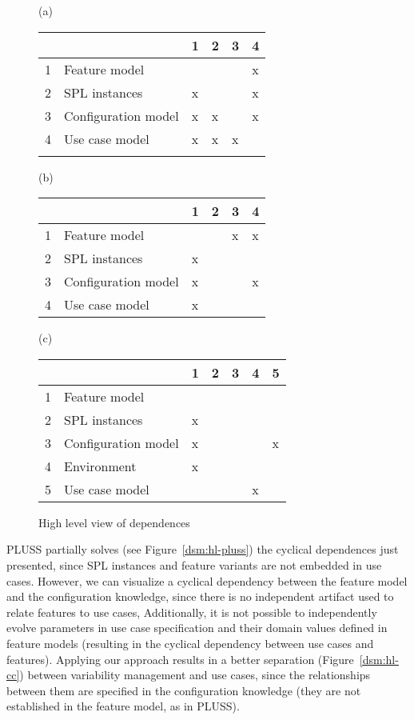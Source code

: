 \documentclass{acm_proc_article-sp}
\begin{document}
\begin{figure}[hb]
\centering
\begin{small}
(a)\newline
\begin{tabular}{llllll} \hline
& & 1 & 2 & 3 & 4 \\ \hline
1 & Feature model 		& 	& 	& 	& x \\ 
2 & SPL instances 		& x 	& 	& 	& x \\
3 & Configuration model 	& x 	& x 	& 	& x \\
4 & Use case model 	& x 	& x 	& x 	& \\ \hline \\
\end{tabular}
(b)\newline
\begin{tabular}{llllll} \hline
& & 1 & 2 & 3 & 4 \\ \hline
1 & Feature model 		& 	& 	& x   & x \\ 
2 & SPL instances 		& x 	& 	& 	&   \\
3 & Configuration model 	& x 	&  	& 	& x \\
4 & Use case model 	& x 	&  	&  	& \\ \hline 
\end{tabular}
(c)\newline
\begin{tabular}{lllllll} \hline
& & 1 & 2 & 3 & 4 & 5 \\ \hline
1 & Feature model 		& 	& 	&      &  	&  	\\ 
2 & SPL instances 		& x 	& 	& 	&   	& 	\\
3 & Configuration model 	& x 	&  	& 	&  	& x	\\
4 & Environment		& x	&	&	&	&  	\\
5 & Use case model 	&  	&  	&  	&  x	& 	\\ \hline
\end{tabular}
\end{small}
\caption{High level view of dependences}
\label{dsm:hl}
\end{figure}

PLUSS partially solves (see Figure~\ref{dsm:hl-pluss}) the cyclical dependences just presented, since SPL instances and feature variants are 
not embedded in use cases. However,  we can visualize a cyclical dependency between the feature model and the configuration knowledge, since there is no independent artifact used to relate features to use cases, Additionally, it is not possible to 
independently evolve parameters in use case specification and their domain values defined in feature models 
(resulting in the cyclical dependency between use cases and features).
Applying our approach results in a better separation (Figure~\ref{dsm:hl-cc}) between
variability management and use cases, since the relationships between them are specified in the
configuration knowledge (they are not established in the feature model, as in PLUSS).
\end{document}
